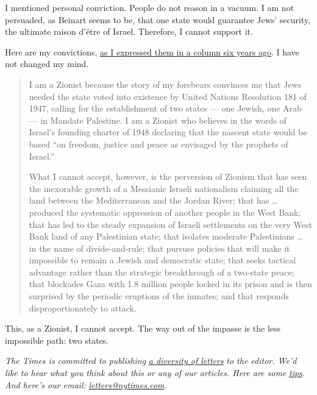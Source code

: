I mentioned personal conviction. People do not reason in a vacuum. I am
not persuaded, as Beinart seems to be, that one state would guarantee
Jews' security, the ultimate raison d'être of Israel. Therefore, I
cannot support it.

Here are my convictions,
\href{https://www.nytimes.com/2014/07/30/opinion/roger-cohen-zionism-and-israels-war-with-hamas-in-gaza.html}{as
I expressed them in a column six years ago}. I have not changed my mind.

\begin{quote}
I am a Zionist because the story of my forebears convinces me that Jews
needed the state voted into existence by United Nations Resolution 181
of 1947, calling for the establishment of two states --- one Jewish, one
Arab --- in Mandate Palestine. I am a Zionist who believes in the words
of Israel's founding charter of 1948 declaring that the nascent state
would be based ``on freedom, justice and peace as envisaged by the
prophets of Israel.''

What I cannot accept, however, is the perversion of Zionism that has
seen the inexorable growth of a Messianic Israeli nationalism claiming
all the land between the Mediterranean and the Jordan River; that has
\ldots{} produced the systematic oppression of another people in the
West Bank; that has led to the steady expansion of Israeli settlements
on the very West Bank land of any Palestinian state; that isolates
moderate Palestinians \ldots{} in the name of divide-and-rule; that
pursues policies that will make it impossible to remain a Jewish and
democratic state; that seeks tactical advantage rather than the
strategic breakthrough of a two-state peace; that blockades Gaza with
1.8 million people locked in its prison and is then surprised by the
periodic eruptions of the inmates; and that responds disproportionately
to attack.
\end{quote}

This, as a Zionist, I cannot accept. The way out of the impasse is the
less impossible path: two states.

\emph{The Times is committed to publishing}
\href{https://www.nytimes.com/2019/01/31/opinion/letters/letters-to-editor-new-york-times-women.html}{\emph{a
diversity of letters}} \emph{to the editor. We'd like to hear what you
think about this or any of our articles. Here are some}
\href{https://help.nytimes.com/hc/en-us/articles/115014925288-How-to-submit-a-letter-to-the-editor}{\emph{tips}}\emph{.
And here's our email:}
\href{mailto:letters@nytimes.com}{\emph{letters@nytimes.com}}\emph{.}

